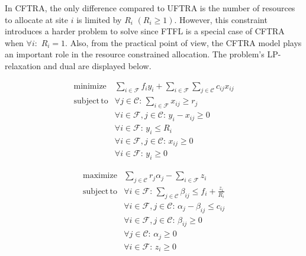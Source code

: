 \documentclass[10pt]{llncs}
\begin{document}
In CFTRA, the only difference compared to UFTRA is the number of resources
to allocate at site $i$ is limited by $R_{i}$ $\left(R_{i}\geq1\right)$.
However, this constraint introduces a harder problem to solve since
FTFL is a special case of CFTRA when $\forall i:$ $R_{i}=1$. Also,
from the practical point of view, the CFTRA model plays an important
role in the resource constrained allocation. The problem's LP-relaxation
and dual are displayed below.

\setlength{\columnsep}{10pt}
\begin{multicols}{2}

{\small \[
\begin{array}{llc}
\mathrm{minimize} & \sum_{i\in\mathcal{F}}f_{i}y_{i}+\sum_{i\in\mathcal{F}}\sum_{j\in\mathcal{C}}c_{ij}x_{ij}\\
\mathrm{subject\, to} & \forall j\in\mathcal{C}:\,\sum_{i\in\mathcal{F}}x_{ij}\ge r_{j}\\
 & \forall i\in\mathcal{F},j\in\mathcal{C}:\, y_{i}-x_{ij}\geq0\\
 & \forall i\in\mathcal{F}:\, y_{i}\leq R_{i}\\
 & \forall i\in\mathcal{F},j\in\mathcal{C}:\, x_{ij}\geq0\\
 & \forall i\in\mathcal{F}:\, y_{i}\geq0\end{array}\]
}{\small \par}

{\small \columnbreak }{\small \par}

{\small \[
\begin{array}{llc}
\textrm{maximize} & \sum_{j\in\mathcal{C}}r_{j}\alpha_{j}-\sum_{i\in\mathcal{F}}z_{i}\\
\mathrm{subject\, to} & \forall i\in\mathcal{F}:\,\sum_{j\in\mathcal{C}}\beta_{ij}\leq f_{i}+\frac{z_{i}}{R_{i}}\\
 & \forall i\in\mathcal{F},j\in\mathcal{C}:\,\alpha_{j}-\beta_{ij}\leq c_{ij}\\
 & \forall i\in\mathcal{F},j\in\mathcal{C}:\,\beta_{ij}\geq0\\
 & \forall j\in\mathcal{C}:\,\alpha_{j}\geq0\\
 & \forall i\in\mathcal{F}:\, z_{i}\geq0\end{array}\]
}{\small \par}

\end{multicols}
\end{document}
